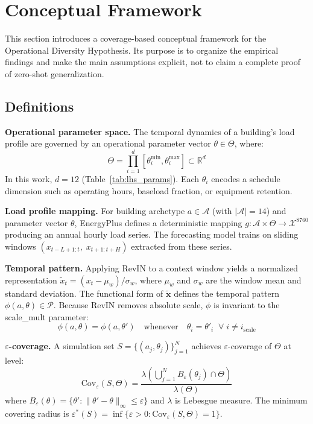 \documentclass[preprint,12pt,authoryear]{elsarticle}
\begin{document}
\section{Conceptual Framework}
\label{sec:framework}

This section introduces a coverage-based conceptual framework for the Operational Diversity Hypothesis. Its purpose is to organize the empirical findings and make the main assumptions explicit, not to claim a complete proof of zero-shot generalization.

\subsection{Definitions}

\textbf{Operational parameter space.} The temporal dynamics of a building's load profile are governed by an operational parameter vector $\theta \in \Theta$, where:
\begin{equation}
\Theta = \prod_{i=1}^{d} [\theta_i^{\min}, \theta_i^{\max}] \subset \mathbb{R}^d
\end{equation}
In this work, $d = 12$ (Table~\ref{tab:lhs_params}). Each $\theta_i$ encodes a schedule dimension such as operating hours, baseload fraction, or equipment retention.

\textbf{Load profile mapping.} For building archetype $a \in \mathcal{A}$ (with $|\mathcal{A}| = 14$) and parameter vector $\theta$, EnergyPlus defines a deterministic mapping $g: \mathcal{A} \times \Theta \to \mathcal{X}^{8760}$ producing an annual hourly load series. The forecasting model trains on sliding windows $(x_{t-L+1:t},\; x_{t+1:t+H})$ extracted from these series.

\textbf{Temporal pattern.} Applying RevIN to a context window yields a normalized representation $\tilde{x}_t = (x_t - \mu_w) / \sigma_w$, where $\mu_w$ and $\sigma_w$ are the window mean and standard deviation. The functional form of $\tilde{\mathbf{x}}$ defines the temporal pattern $\phi(a, \theta) \in \mathcal{P}$. Because RevIN removes absolute scale, $\phi$ is invariant to the scale\_mult parameter:
\begin{equation}
\phi(a, \theta) = \phi(a, \theta') \quad \text{whenever} \quad \theta_i = \theta'_i \;\;\forall\; i \neq i_{\text{scale}}
\end{equation}

\textbf{$\varepsilon$-coverage.} A simulation set $S = \{(a_j, \theta_j)\}_{j=1}^{N}$ achieves $\varepsilon$-coverage of $\Theta$ at level:
\begin{equation}
\mathrm{Cov}_\varepsilon(S, \Theta) = \frac{\lambda\!\left(\bigcup_{j=1}^{N} B_\varepsilon(\theta_j) \cap \Theta\right)}{\lambda(\Theta)}
\end{equation}
where $B_\varepsilon(\theta) = \{\theta' : \|\theta' - \theta\|_\infty \leq \varepsilon\}$ and $\lambda$ is Lebesgue measure. The minimum covering radius is $\varepsilon^*(S) = \inf\{\varepsilon > 0 : \mathrm{Cov}_\varepsilon(S,\Theta) = 1\}$.
\end{document}
